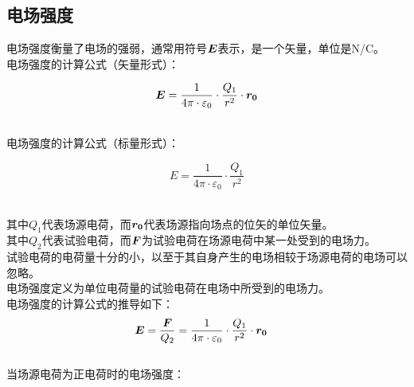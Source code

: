 \documentclass[UTF8]{ctexart}
\newcommand*{\veb}[1]{\vb*{#1}}
\begin{document}
\subsection{电场强度}
    \setcounter{equation}{0}
    电场强度衡量了电场的强弱，通常用符号$\veb{E}$表示，是一个矢量，单位是\si{N/C}。\\[3mm]
    电场强度的计算公式（矢量形式）：
    \begin{large}
        \begin{equation*}
            \veb{E}=\frac{1}{4\pi\cdot\varepsilon_0}\cdot\frac{Q_1}{r^2}\cdot\veb{r_0}
        \end{equation*}
    \end{large}\\
    电场强度的计算公式（标量形式）：
    \begin{large}
        \begin{equation*}
            E=\frac{1}{4\pi\cdot\varepsilon_0}\cdot\frac{Q_1}{r^2}
        \end{equation*}
    \end{large}\\
    其中$Q_1$代表场源电荷，而$\veb{r_0}$代表场源指向场点的位矢的单位矢量。\\[3mm]
    其中$Q_2$代表试验电荷，而$\veb{F}$为试验电荷在场源电荷中某一处受到的电场力。\\[3mm]
    试验电荷的电荷量十分的小，以至于其自身产生的电场相较于场源电荷的电场可以忽略。\\[6mm]
    电场强度定义为单位电荷量的试验电荷在电场中所受到的电场力。\\[3mm]
    电场强度的计算公式的推导如下：
    \begin{align}
        &\veb{E}=\frac{\veb{F}}{Q_2}=\frac{1}{4\pi\cdot\varepsilon_0}\cdot\frac{Q_1}{r^2}\cdot\veb{r_0}
    \end{align}\\
    当场源电荷为正电荷时的电场强度：
\end{document}
